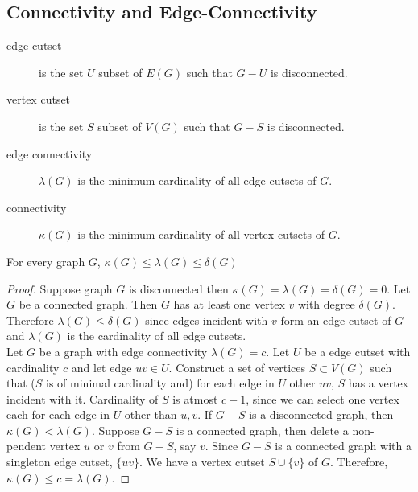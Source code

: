 

\setcounter{subsection}{4}

\subsection{Connectivity and Edge-Connectivity}

\begin{description}
	\item[edge cutset] is the set $U$ subset of $E(G)$ such that $G-U$ is disconnected.
	\item[vertex cutset] is the set $S$ subset of $V(G)$ such that $G-S$ is disconnected.
	\item[edge connectivity] $\lambda(G)$ is the minimum cardinality of all edge cutsets of $G$.
	\item[connectivity] $\kappa(G)$ is the minimum cardinality of all vertex cutsets of $G$.
\end{description}

\begin{theorem}
	For every graph $G$, $\kappa(G) \le \lambda(G) \le \delta(G)$
\end{theorem}
\begin{proof}
	Suppose graph $G$ is disconnected then $\kappa(G) = \lambda(G) = \delta(G) = 0$.
	Let $G$ be a connected graph.
	Then $G$ has at least one vertex $v$ with degree $\delta(G)$.
	Therefore $\lambda(G) \le \delta(G)$ since edges incident with $v$ form an edge cutset of $G$ and $\lambda(G)$ is the cardinality of all edge cutsets.\\


	Let $G$ be a graph with edge connectivity $\lambda(G) = c$.
	Let $U$ be a edge cutset with cardinality $c$ and let edge $uv \in U$.
	Construct a set of vertices $S \subset V(G)$ such that ($S$ is of minimal cardinality and) for each edge in $U$ other $uv$, $S$ has a vertex incident with it.
	Cardinality of $S$ is atmost $c-1$, since we can select one vertex each for each edge in $U$ other than $u, v$.
	If $G-S$ is a disconnected graph, then $\kappa(G) < \lambda(G)$.
	Suppose $G-S$ is a connected graph, then delete a non-pendent vertex $u$ or $v$ from $G-S$, say $v$.
	Since $G-S$ is a connected graph with a singleton edge cutset, $\{ uv \}$.
	We have a vertex cutset $S \cup \{ v\}$ of $G$.
	Therefore, $\kappa(G) \le c = \lambda(G)$.
\end{proof}


